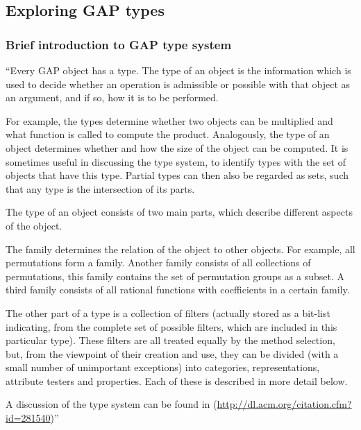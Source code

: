\subsection{Exploring GAP types}

\subsubsection{Brief introduction to GAP type system}\label{gap-types-intro}


``Every GAP object has a type. The type of an object is the information 
which is used to decide whether an operation is admissible or possible 
with that object as an argument, and if so, how it is to be performed.

For example, the types determine whether two objects can be multiplied 
and what function is called to compute the product. Analogously, the 
type of an object determines whether and how the size of the object 
can be computed. It is sometimes useful in discussing the type system, 
to identify types with the set of objects that have this type. Partial 
types can then also be regarded as sets, such that any type is the 
intersection of its parts.

The type of an object consists of two main parts, which describe 
different aspects of the object.

The family determines the relation of the object to other objects. 
For example, all permutations form a family. Another family consists 
of all collections of permutations, this family contains the set of 
permutation groups as a subset. A third family consists of all 
rational functions with coefficients in a certain family.

The other part of a type is a collection of filters (actually stored 
as a bit-list indicating, from the complete set of possible filters, 
which are included in this particular type). These filters are all 
treated equally by the method selection, but, from the viewpoint of 
their creation and use, they can be divided (with a small number of 
unimportant exceptions) into categories, representations, attribute 
testers and properties. Each of these is described in more detail below.

A discussion of the type system can be found in \cite{breuer-linton}
(\url{http://dl.acm.org/citation.cfm?id=281540})''

